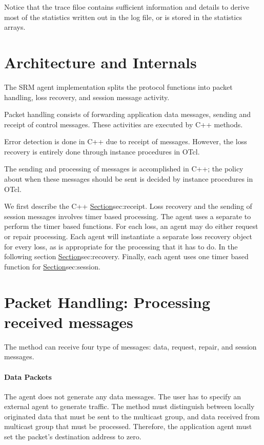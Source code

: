 Notice that the trace filoe contains sufficient information and details
to derive most of the statistics written out in the log file, or
is stored in the statistics arrays.

\section{Architecture and Internals}
\label{sec:architecture}

The SRM agent implementation splits the protocol functions
into packet handling, loss recovery, and session message activity.
\begin{list}{}{}
\item  Packet handling consists of forwarding application data messages,
  sending and receipt of control messages.
  These activities are executed by C++ methods.
\item  Error detection is done in C++ due to receipt of messages.
  However, the loss recovery is entirely done through 
  instance procedures in OTcl.
\item  The sending and processing of messages is accomplished in C++;
  the policy about when these messages should be sent is decided
  by instance procedures in OTcl.
\end{list}
We first describe the C++
\href{processing due to receipt of messages}{Section}{sec:receipt}.
Loss recovery and the sending of session messages involves
timer based processing.
The agent uses a separate 
to perform the timer based functions.
For each loss, an agent may do either request or repair processing.
Each agent will instantiate a separate loss recovery object
for every loss, as is appropriate for the processing that it has to do.
In the following section
\href{we describe the basic timer based functions and
the loss recovery mechanisms}{Section}{sec:recovery}.
Finally, each agent uses one timer based function
for \href{sending periodic session messages}{Section}{sec:session}.

\section{Packet Handling: Processing received messages}
\label{sec:receipt}

The
method can receive four type of messages:
data, request, repair, and session messages.

\paragraph{Data Packets}
The agent does not generate any data messages.
The user has to specify an external agent to generate traffic.
The  method must distinguish between
locally originated data that must be sent to the multicast group,
and data received from multicast group that must be processed.
Therefore, the application agent must
set the packet's destination address to zero.

